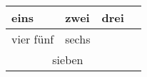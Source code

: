 \begin{tabular}{llll}
  eins & zwei & drei \\ \hline
  vier \vline{} f\"unf & sechs & \\
  \cline{1-2}
  \multicolumn{3}{|c|}{sieben}
\end{tabular}
